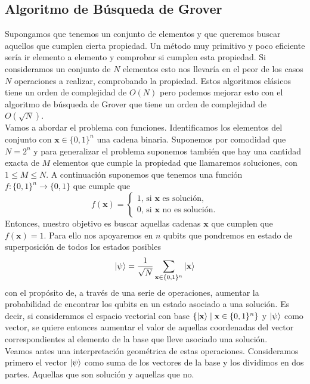 \documentclass[a4paper]{article}
\numberwithin{equation}{section}
\begin{document}
\subsection{Algoritmo de Búsqueda de Grover}
Supongamos que tenemos un conjunto de elementos y que queremos buscar aquellos que cumplen cierta propiedad. Un método muy primitivo y poco eficiente sería ir elemento a elemento y comprobar si cumplen esta propiedad. Si consideramos un conjunto de $N$ elementos esto nos llevaría en el peor de los casos $N$ operaciones a realizar, comprobando la propiedad. Estos algoritmos clásicos tiene un orden de complejidad de $O(N)$ pero podemos mejorar esto con el algoritmo de búsqueda de Grover que tiene un orden de complejidad de $O(\sqrt{N})$.\\
\linebreak
Vamos a abordar el problema con funciones. Identificamos los elementos del conjunto con $\mathbf{x} \in \{ 0, 1\}^n$ una cadena binaria. Suponemos por comodidad que $N = 2^n$ y para generalizar el problema suponemos también que hay una cantidad exacta de $M$ elementos que cumple la propiedad que llamaremos soluciones, con $1\leq M \leq N$. A continuación suponemos que tenemos una función $f:\{ 0, 1\}^n \longrightarrow \{ 0, 1\}$ que cumple que
\begin{equation}
f(\mathbf{x}) =
\begin{cases}
1\text{, si } \mathbf{x} \text{ es solución,} \\
0\text{, si } \mathbf{x} \text{ no es solución.}
\end{cases}
\end{equation}
Entonces, nuestro objetivo es buscar aquellas cadenas $\mathbf{x}$ que cumplen que $f(\mathbf{x}) = 1$. Para ello nos apoyaremos en $n$ qubits que pondremos en estado de superposición de todos los estados posibles
\begin{equation}
\ket{\psi} = \frac{1}{\sqrt{N}} \sum_{\mathbf{x}\in\{0,1\}^n} \ket{\mathbf{x}}
\end{equation}
con el propósito de, a través de una serie de operaciones, aumentar la probabilidad de encontrar los qubits en un estado asociado a una solución. Es decir, si consideramos el espacio vectorial con base $\lbrace \ket{\mathbf{x}} \mid \mathbf{x}\in\{0,1\}^n \rbrace$ y $\ket{\psi}$ como vector, se quiere entonces aumentar el valor de aquellas coordenadas del vector correspondientes al elemento de la base que lleve asociado una solución.\\
\linebreak
Veamos antes una interpretación geométrica de estas operaciones. Consideramos primero el vector $\ket{\psi}$ como suma de los vectores de la base y los dividimos en dos partes. Aquellas que son solución y aquellas que no.
\end{document}
